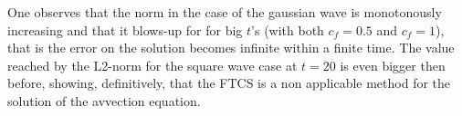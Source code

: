 \documentclass[11pt,a4paper]{article}
\begin{document}
\begin{figure}[!h]
\centering
{}
\end{figure}
One observes that the norm in the case of the gaussian wave is monotonously increasing and that it blows-up for for big $t$'s (with both $c_f=0.5$ and $c_f=1$), that is the error on the solution becomes infinite within a finite time. The value reached by the L2-norm for the square wave case at $t=20$ is even bigger then before, showing, definitively, that the FTCS is a non applicable method for the solution of the avvection equation. 
\end{document}
